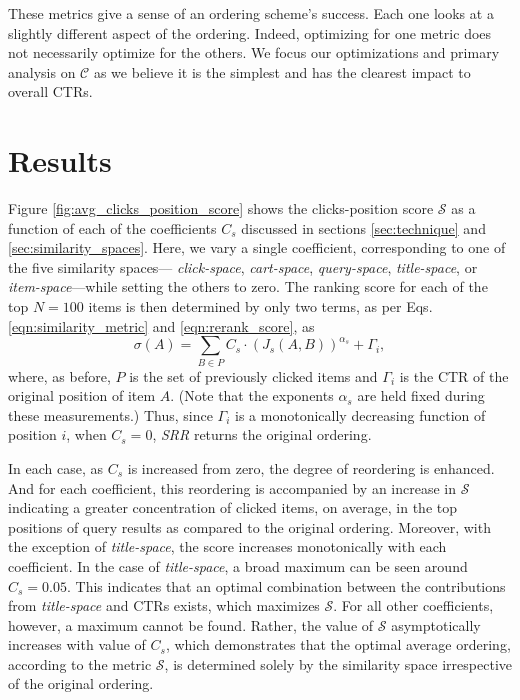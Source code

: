 \documentclass{article}
\begin{document}
These metrics give a sense of an ordering scheme's success. Each one looks at a slightly 
different aspect of the ordering. Indeed, optimizing for one metric does not necessarily 
optimize for the others. We focus our optimizations and primary analysis on $\mathscr{C}$
as we believe it is the simplest and has the clearest impact to overall CTRs.

\section{Results}

Figure \ref{fig:avg_clicks_position_score} shows the clicks-position score
$\mathscr{S}$ as a function of each of the coefficients $C_s$ discussed in
sections \ref{sec:technique} and \ref{sec:similarity_spaces}. Here, we vary a
single coefficient, corresponding to one of the five similarity spaces---{\em
click-space}, {\em cart-space}, {\em query-space}, {\em title-space}, or {\em
item-space}---while setting the others to zero. The ranking score for each of
the top $N=100$ items is then determined by only two terms, as per Eqs.
\ref{eqn:similarity_metric} and \ref{eqn:rerank_score}, as
\begin{equation}\label{eqn:single_coeff_score} 
    \sigma(A) = \sum_{B \in P}{C_s\cdot(J_s(A,B))^{\alpha_s}} + \Gamma_i, 
\end{equation}
where, as before, $P$ is the set of previously clicked items and $\Gamma_i$ is
the CTR of the original position of item $A$. (Note that the exponents
$\alpha_s$ are held fixed during these measurements.) Thus, since $\Gamma_i$ is
a monotonically decreasing function of position $i$, when $C_s = 0$, {\em SRR}
returns the original ordering.

In each case, as $C_s$ is increased from zero, the degree of reordering is
enhanced.  And for each coefficient, this reordering is accompanied by an
increase in $\mathscr{S}$ indicating a greater concentration of clicked items,
on average, in the top positions of query results as compared to the original
ordering.  Moreover, with the exception of {\em title-space}, the score
increases monotonically with each coefficient. In the case of {\em
title-space}, a broad maximum can be seen around $C_s = 0.05$. This indicates
that an optimal combination between the contributions from {\em title-space}
and CTRs exists, which maximizes $\mathscr{S}$. For all other coefficients,
however, a maximum cannot be found. Rather, the value of $\mathscr{S}$
asymptotically increases with value of $C_s$, which demonstrates that the
optimal average ordering, according to the metric $\mathscr{S}$, is determined
solely by the similarity space irrespective of the original ordering.
\end{document}
